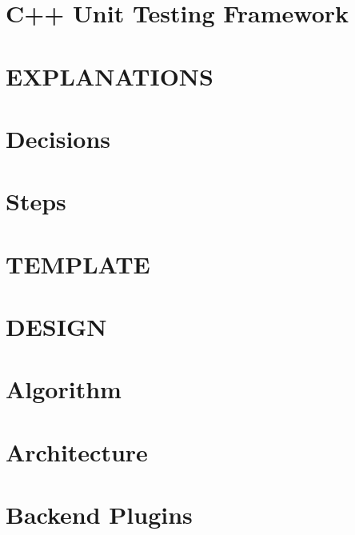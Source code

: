 \let\mypdfximage\pdfximage\def\pdfximage{\immediate\mypdfximage}\documentclass[twoside]{book}
\newcommand{\+}{\discretionary{\mbox{\scriptsize$\hookleftarrow$}}{}{}}
\begin{document}
\chapter{C++ Unit Testing Framework}
\label{doc_decisions_6_implemented_unit_testing_md}

\chapter{EXPLANATIONS}
\label{doc_decisions_EXPLANATIONS_md}

\chapter{Decisions}
\label{doc_decisions_README_md}

\chapter{Steps}
\label{doc_decisions_STEPS_md}

\chapter{TEMPLATE}
\label{doc_decisions_TEMPLATE_md}

\chapter{DESIGN}
\label{doc_DESIGN_md}

\chapter{Algorithm}
\label{doc_dev_algorithm_md}

\chapter{Architecture}
\label{doc_dev_architecture_md}

\chapter{Backend Plugins}
\label{doc_dev_backend-plugins_md}

\end{document}
